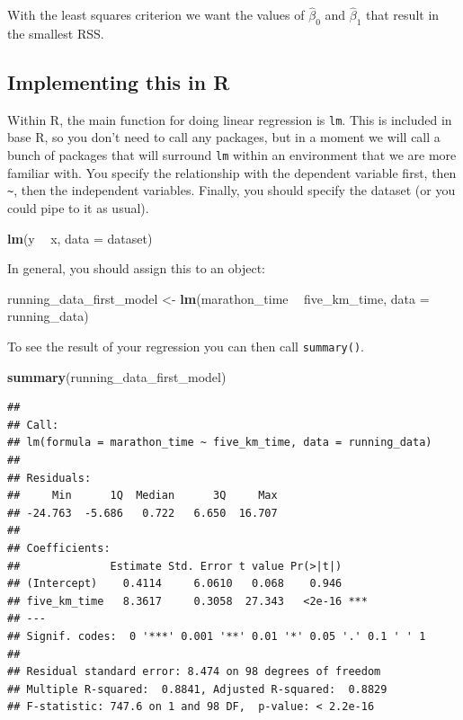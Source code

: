 \documentclass[
]{book}
\newenvironment{Shaded}{\begin{snugshade}}{\end{snugshade}}
\newcommand{\DataTypeTok}[1]{\textcolor[rgb]{0.13,0.29,0.53}{#1}}
\newcommand{\KeywordTok}[1]{\textcolor[rgb]{0.13,0.29,0.53}{\textbf{#1}}}
\newcommand{\NormalTok}[1]{#1}
\newcommand{\OperatorTok}[1]{\textcolor[rgb]{0.81,0.36,0.00}{\textbf{#1}}}
\newcommand{\StringTok}[1]{\textcolor[rgb]{0.31,0.60,0.02}{#1}}
\begin{document}
With the least squares criterion we want the values of \(\hat{\beta}_0\) and \(\hat{\beta}_1\) that result in the smallest RSS.

\hypertarget{implementing-this-in-r}{%
\subsection{Implementing this in R}\label{implementing-this-in-r}}

Within R, the main function for doing linear regression is \texttt{lm}. This is included in base R, so you don't need to call any packages, but in a moment we will call a bunch of packages that will surround \texttt{lm} within an environment that we are more familiar with. You specify the relationship with the dependent variable first, then \texttt{\textasciitilde{}}, then the independent variables. Finally, you should specify the dataset (or you could pipe to it as usual).

\begin{Shaded}
\begin{Highlighting}[]
\KeywordTok{lm}\NormalTok{(y }\OperatorTok{~}\StringTok{ }\NormalTok{x, }\DataTypeTok{data =}\NormalTok{ dataset)}
\end{Highlighting}
\end{Shaded}

In general, you should assign this to an object:

\begin{Shaded}
\begin{Highlighting}[]
\NormalTok{running_data_first_model <-}\StringTok{ }\KeywordTok{lm}\NormalTok{(marathon_time }\OperatorTok{~}\StringTok{ }\NormalTok{five_km_time, }
                               \DataTypeTok{data =}\NormalTok{ running_data)}
\end{Highlighting}
\end{Shaded}

To see the result of your regression you can then call \texttt{summary()}.

\begin{Shaded}
\begin{Highlighting}[]
\KeywordTok{summary}\NormalTok{(running_data_first_model)}
\end{Highlighting}
\end{Shaded}

\begin{verbatim}
## 
## Call:
## lm(formula = marathon_time ~ five_km_time, data = running_data)
## 
## Residuals:
##     Min      1Q  Median      3Q     Max 
## -24.763  -5.686   0.722   6.650  16.707 
## 
## Coefficients:
##              Estimate Std. Error t value Pr(>|t|)    
## (Intercept)    0.4114     6.0610   0.068    0.946    
## five_km_time   8.3617     0.3058  27.343   <2e-16 ***
## ---
## Signif. codes:  0 '***' 0.001 '**' 0.01 '*' 0.05 '.' 0.1 ' ' 1
## 
## Residual standard error: 8.474 on 98 degrees of freedom
## Multiple R-squared:  0.8841, Adjusted R-squared:  0.8829 
## F-statistic: 747.6 on 1 and 98 DF,  p-value: < 2.2e-16
\end{verbatim}
\end{document}
